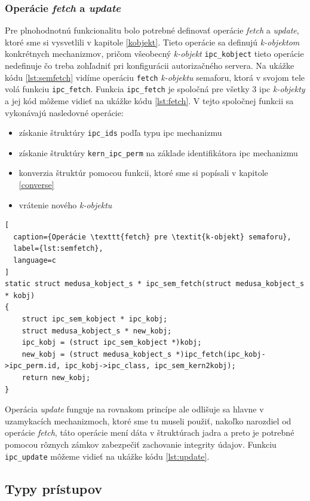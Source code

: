 \subsubsection{Operácie \textit{fetch} a \textit{update}} \label{ops}
Pre plnohodnotnú funkcionalitu bolo potrebné definovať operácie \textit{fetch} a \textit{update}, ktoré sme si vysvetlili v kapitole \ref{kobjekt}. Tieto operácie sa definujú \textit{k-objektom} konkrétnych mechanizmov, pričom všeobecný \textit{k-objekt} \texttt{ipc\_kobject} tieto operácie nedefinuje čo treba zohľadniť pri konfigurácii autorizačného servera. Na ukážke kódu \ref{lst:semfetch} vidíme operáciu \texttt{fetch} \textit{k-objektu} semaforu, ktorá v svojom tele volá funkciu \texttt{ipc\_fetch}. Funkcia \texttt{ipc\_fetch} je spoločná pre všetky 3 \acrshort{ipc} \textit{k-objekty} a jej kód môžeme vidieť na ukážke kódu \ref{lst:fetch}. V tejto spoločnej funkcii sa vykonávajú nasledovné operácie:
\begin{itemize}
\item získanie štruktúry \texttt{ipc\_ids} podľa typu \acrshort{ipc} mechanizmu
\item získanie štruktúry \texttt{kern\_ipc\_perm} na základe identifikátora \acrshort{ipc} mechanizmu
\item konverzia štruktúr pomocou funkcii, ktoré sme si popísali v kapitole \ref{converse}
\item vrátenie nového \textit{k-objektu}
\end{itemize}
\begin{lstlisting}[
  caption={Operácie \texttt{fetch} pre \textit{k-objekt} semaforu},
  label={lst:semfetch},
  language=c
]
static struct medusa_kobject_s * ipc_sem_fetch(struct medusa_kobject_s * kobj)
{
	struct ipc_sem_kobject * ipc_kobj;
	struct medusa_kobject_s * new_kobj;
	ipc_kobj = (struct ipc_sem_kobject *)kobj;
	new_kobj = (struct medusa_kobject_s *)ipc_fetch(ipc_kobj->ipc_perm.id, ipc_kobj->ipc_class, ipc_sem_kern2kobj);
	return new_kobj;
}
\end{lstlisting}
Operácia \textit{update} funguje na rovnakom princípe ale odlišuje sa hlavne v uzamykacích mechanizmoch, ktoré sme tu museli použiť, nakoľko narozdiel od operácie \textit{fetch}, táto operácie mení dáta v štruktúrach jadra a preto je potrebné pomocou rôznych zámkov zabezpečiť zachovanie integrity údajov. Funkciu \texttt{ipc_update} môžeme vidieť na ukážke kódu \ref{lst:update}. 




\subsection{Typy prístupov}
